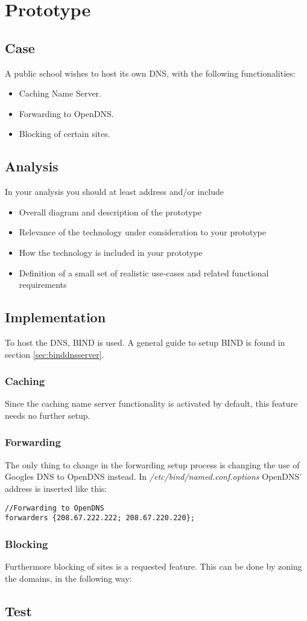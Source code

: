 \chapter{Prototype}
\section{Case}
A public school wishes to host its own DNS, with the following functionalities:
\begin{itemize}
\item Caching Name Server.
\item Forwarding to OpenDNS.
\item Blocking of certain sites.
\end{itemize}

\section{Analysis}

In your analysis you should at least address and/or include

\begin{itemize}
\item Overall diagram and description of the prototype
\item Relevance of the technology under consideration to your prototype
\item How the technology is included in your prototype
\item Definition of a small set of realistic use-cases and related
  functional requirements
\end{itemize}

\section{Implementation}
To host the DNS, BIND is used. A general guide to setup BIND is found in section \ref{sec:binddnsserver}.

\subsection{Caching}
Since the caching name server functionality is activated by default, this feature needs no further setup.

\subsection{Forwarding}
The only thing to change in the forwarding setup process is changing the use of Googles DNS to OpenDNS instead. In \emph{/etc/bind/named.conf.options} OpenDNS' address is inserted like this:

\texttt{//Forwarding to OpenDNS} \\
\texttt{forwarders \{208.67.222.222; 208.67.220.220\};}

\subsection{Blocking}

Furthermore blocking of sites is a requested feature. This can be done by zoning the domains, in the following way:

\section{Test}

